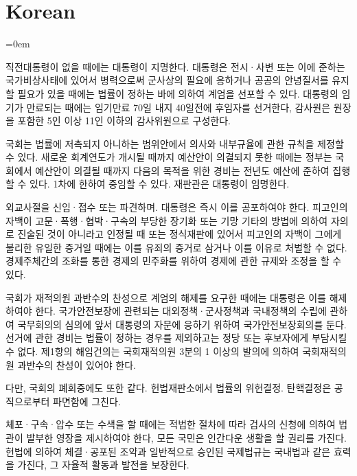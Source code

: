 
\section{Korean}
\label{sec:korean}
\parindent=0em

\begin{CJK}{UTF8}{}

직전대통령이 없을 때에는 대통령이 지명한다. 대통령은 전시·사변 또는 이에 준하는
국가비상사태에 있어서 병력으로써 군사상의 필요에 응하거나 공공의 안녕질서를
유지할 필요가 있을 때에는 법률이 정하는 바에 의하여 계엄을 선포할 수 있다.
대통령의 임기가 만료되는 때에는 임기만료 70일 내지 40일전에 후임자를 선거한다,
감사원은 원장을 포함한 5인 이상 11인 이하의 감사위원으로 구성한다.

국회는 법률에 저촉되지 아니하는 범위안에서 의사와 내부규율에 관한 규칙을 제정할
수 있다. 새로운 회계연도가 개시될 때까지 예산안이 의결되지 못한 때에는 정부는
국회에서 예산안이 의결될 때까지 다음의 목적을 위한 경비는 전년도 예산에 준하여
집행할 수 있다. 1차에 한하여 중임할 수 있다. 재판관은 대통령이 임명한다.

외교사절을 신임·접수 또는 파견하며. 대통령은 즉시 이를 공포하여야 한다. 피고인의
자백이 고문·폭행·협박·구속의 부당한 장기화 또는 기망 기타의 방법에 의하여 자의로
진술된 것이 아니라고 인정될 때 또는 정식재판에 있어서 피고인의 자백이 그에게
불리한 유일한 증거일 때에는 이를 유죄의 증거로 삼거나 이를 이유로 처벌할 수
없다. 경제주체간의 조화를 통한 경제의 민주화를 위하여 경제에 관한 규제와 조정을
할 수 있다.

국회가 재적의원 과반수의 찬성으로 계엄의 해제를 요구한 때에는 대통령은 이를
해제하여야 한다. 국가안전보장에 관련되는 대외정책·군사정책과 국내정책의 수립에
관하여 국무회의의 심의에 앞서 대통령의 자문에 응하기 위하여 국가안전보장회의를
둔다. 선거에 관한 경비는 법률이 정하는 경우를 제외하고는 정당 또는 후보자에게
부담시킬 수 없다. 제1항의 해임건의는 국회재적의원 3분의 1 이상의 발의에 의하여
국회재적의원 과반수의 찬성이 있어야 한다.

다만, 국회의 폐회중에도 또한 같다. 헌법재판소에서 법률의 위헌결정. 탄핵결정은
공직으로부터 파면함에 그친다.

체포·구속·압수 또는 수색을 할 때에는 적법한 절차에 따라 검사의 신청에 의하여
법관이 발부한 영장을 제시하여야 한다, 모든 국민은 인간다운 생활을 할 권리를
가진다. 헌법에 의하여 체결·공포된 조약과 일반적으로 승인된 국제법규는 국내법과
같은 효력을 가진다, 그 자율적 활동과 발전을 보장한다.


\end{CJK}
